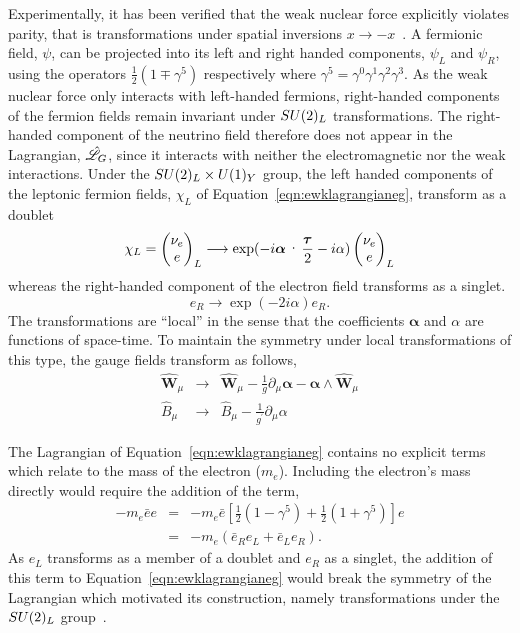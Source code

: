 Experimentally, it has been verified that the weak nuclear force explicitly violates
parity, that is transformations under spatial inversions $x\rightarrow -x$~\citep{wu}.
A fermionic field, $\psi$, can be projected into its left and right handed components, 
$\psi_{L}$ and $\psi_{R}$, using the operators $\frac{1}{2}(1\mp\gamma^{5})$ respectively 
where $\gamma^{5} = \gamma^{0}\gamma^{1}\gamma^{2}\gamma^{3}$. 
As the weak nuclear force only interacts with left-handed fermions, 
right-handed components of the fermion fields remain invariant under $SU(2)_{L}$ transformations.
The right-handed component of the neutrino field therefore does not appear 
in the Lagrangian, $\hat{\mathscr{L}}_{G}$, since it interacts with neither the electromagnetic nor the weak interactions.
Under the $SU(2)_{L}\times U(1)_{Y}$ group, 
the left handed components of the leptonic fermion fields,
$\chi_{L}$ of Equation~\ref{eqn:ewklagrangianeg}, transform as a doublet
\begin{equation}
\chi_{L}  =   
\everymath{\displaystyle} \begin{pmatrix}
\nu_{e} \\ 
e
\end{pmatrix}_{L}
 \longrightarrow 
\exp(-i\boldsymbol\alpha\cdot\frac{\boldsymbol\tau}{2} - i\alpha) 
\begin{pmatrix}
\nu_{e} \\ 
e
\end{pmatrix}_{L}
\end{equation}
\label{eqn:doublettrans}
whereas the right-handed component of the electron field transforms as a singlet.  
\begin{equation}
e_{R}
 \longrightarrow 
\exp(-2i{\alpha}) 
e_{R}.
\end{equation}
The transformations are ``local'' in the sense that the coefficients  
$\boldsymbol{\alpha}$ and $\alpha$ are functions of space-time. 
To maintain the symmetry under local transformations of this type, the gauge fields
transform as follows, 
\begin{eqnarray}
\hat{\mathbf{W}}_{\mu} & 
 \longrightarrow & 
\hat{\mathbf{W}}_{\mu} - \frac{1}{g}\partial_{\mu}\boldsymbol{\alpha} 
	- \boldsymbol{\alpha}\wedge\hat{\mathbf{W}}_{\mu} \\
\hat{{B}}_{\mu} & 
 \longrightarrow & 
\hat{{B}}_{\mu} - \frac{1}{g^{\prime}}\partial_{\mu}{\alpha} 
\end{eqnarray}

The Lagrangian of Equation~\ref{eqn:ewklagrangianeg} contains no explicit terms which 
relate to the mass of the electron ($m_{e}$). Including the electron's mass directly would 
require the addition of the term,
\begin{eqnarray}
-m_{e}\bar{e}e  &=& -m_{e}\bar{e}\left[\frac{1}{2}\left(1-\gamma^{5}\right) 
		    + \frac{1}{2}\left(1+\gamma^{5}\right)\right]e \nonumber \\
		&=& -m_{e}\left(\bar{e}_{R}e_{L} + \bar{e}_{L}e_{R}\right).
\end{eqnarray}
As $e_{L}$ transforms as a member of a doublet and $e_{R}$ as a singlet, 
the addition of this term to Equation~\ref{eqn:ewklagrangianeg} 
would break the symmetry of the Lagrangian which motivated its construction, 
namely transformations under the $SU(2)_{L}$ group~\citep{aitchison}.

